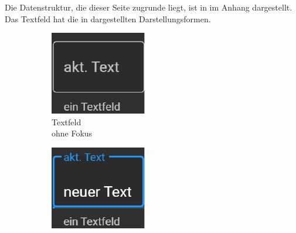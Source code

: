 Die Datenstruktur, die dieser Seite zugrunde liegt, ist in  im Anhang dargestellt.
Das Textfeld hat die in  dargestellten Darstellungsformen.
\begin{figure}[ht]
  \centering
  \hspace{0.05\textwidth}
  \begin{subfigure}[h]{0.24\textwidth}
    \centering
    \includegraphics[width=\textwidth]{content/hauptteil/umsetzungPoC/frontend/res/TextfeldNoFokus.pdf}
    \caption{Textfeld \\ohne Fokus}
    \label{fig:frontend:poc:textFeld:noFocus}
  \end{subfigure}
  \hfill
  \begin{subfigure}[h]{0.24\textwidth}
    \centering
    \includegraphics[width=\textwidth]{content/hauptteil/umsetzungPoC/frontend/res/TextfeldFokus.pdf}

\end{subfigure}
\end{figure}
